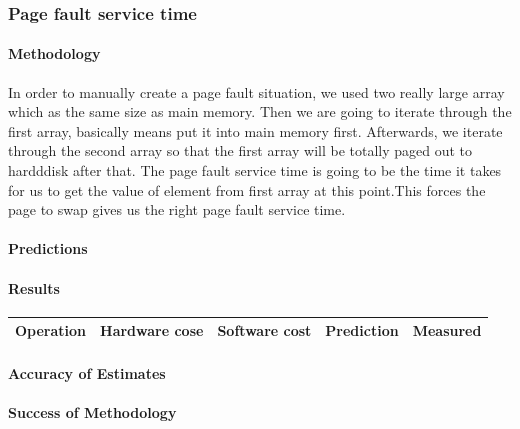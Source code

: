 \subsubsection{Page fault service time}
\paragraph{Methodology}
In order to manually create a page fault situation, we used two really large array which as the same size as main memory. Then we are going to iterate through the first array, basically means put it into main memory first. Afterwards, we iterate through the second array so that the first array will be totally paged out to hardddisk after that. The page fault service time is going to be the time it takes for us to get the value of element from first array at this point.This forces the page to swap gives us the right page fault service time. 
\paragraph{Predictions}
\paragraph{Results}

\begin{center}
\begin{tabular}{| l | l | l | l | l |}
\hline
Operation & Hardware cose & Software cost & Prediction & Measured \\
\hline
\end{tabular}
\end{center}

\paragraph{Accuracy of Estimates}
\paragraph{Success of Methodology}
